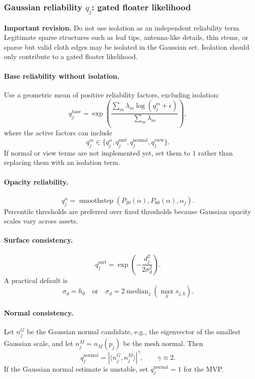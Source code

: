 \documentclass[11pt,a4paper]{article}
\newcommand{\smoothstep}{\operatorname{smoothstep}}
\begin{document}
\subsubsection{Gaussian reliability $q_j$: gated floater likelihood}

\textbf{Important revision.} Do not use isolation as an independent reliability term. Legitimate sparse structures such as leaf tips, antenna-like details, thin stems, or sparse but valid cloth edges may be isolated in the Gaussian set. Isolation should only contribute to a gated floater likelihood.

\paragraph{Base reliability without isolation.}
Use a geometric mean of positive reliability factors, excluding isolation:
\[
q_j^{\mathrm{base}}=\exp\left(
\frac{\sum_m \lambda_m\log(q_j^m+\epsilon)}{\sum_m\lambda_m}
\right),
\]
where the active factors can include
\[
q_j^m\in\{q_j^{\alpha},q_j^{\mathrm{surf}},q_j^{\mathrm{normal}},q_j^{\mathrm{view}}\}.
\]
If normal or view terms are not implemented yet, set them to $1$ rather than replacing them with an isolation term.

\paragraph{Opacity reliability.}
\[
q_j^{\alpha}=\smoothstep(P_{20}(\alpha),P_{80}(\alpha),\alpha_j).
\]
Percentile thresholds are preferred over fixed thresholds because Gaussian opacity scales vary across assets.

\paragraph{Surface consistency.}
\[
q_j^{\mathrm{surf}}=\exp\left(-\frac{d_j^2}{2\sigma_d^2}\right).
\]
A practical default is
\[
\sigma_d=h_0
\quad\text{or}\quad
\sigma_d=2\operatorname{median}_j(\max_k s_{j,k}).
\]

\paragraph{Normal consistency.}
Let $n_j^G$ be the Gaussian normal candidate, e.g., the eigenvector of the smallest Gaussian scale, and let $n_j^M=n_M(p_j)$ be the mesh normal. Then
\[
q_j^{\mathrm{normal}}=|\langle n_j^G,n_j^M\rangle|^\gamma,
\qquad \gamma\approx 2.
\]
If the Gaussian normal estimate is unstable, set $q_j^{\mathrm{normal}}=1$ for the MVP.
\end{document}
